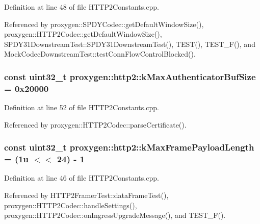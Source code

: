 Definition at line 48 of file H\+T\+T\+P2\+Constants.\+cpp.



Referenced by proxygen\+::\+S\+P\+D\+Y\+Codec\+::get\+Default\+Window\+Size(), proxygen\+::\+H\+T\+T\+P2\+Codec\+::get\+Default\+Window\+Size(), S\+P\+D\+Y31\+Downstream\+Test\+::\+S\+P\+D\+Y31\+Downstream\+Test(), T\+E\+S\+T(), T\+E\+S\+T\+\_\+\+F(), and Mock\+Codec\+Downstream\+Test\+::test\+Conn\+Flow\+Control\+Blocked().

\subsubsection[{k\+Max\+Authenticator\+Buf\+Size}]{\setlength{\rightskip}{0pt plus 5cm}const uint32\+\_\+t proxygen\+::http2\+::k\+Max\+Authenticator\+Buf\+Size = 0x20000}\label{namespaceproxygen_1_1http2_aebafdfb573a05465b2a2e90b5feff59a}


Definition at line 52 of file H\+T\+T\+P2\+Constants.\+cpp.



Referenced by proxygen\+::\+H\+T\+T\+P2\+Codec\+::parse\+Certificate().

\subsubsection[{k\+Max\+Frame\+Payload\+Length}]{\setlength{\rightskip}{0pt plus 5cm}const uint32\+\_\+t proxygen\+::http2\+::k\+Max\+Frame\+Payload\+Length = (1u $<$$<$ 24) -\/ 1}\label{namespaceproxygen_1_1http2_ac0c68679178463270c516ddae0380fc2}


Definition at line 46 of file H\+T\+T\+P2\+Constants.\+cpp.



Referenced by H\+T\+T\+P2\+Framer\+Test\+::data\+Frame\+Test(), proxygen\+::\+H\+T\+T\+P2\+Codec\+::handle\+Settings(), proxygen\+::\+H\+T\+T\+P2\+Codec\+::on\+Ingress\+Upgrade\+Message(), and T\+E\+S\+T\+\_\+\+F().

